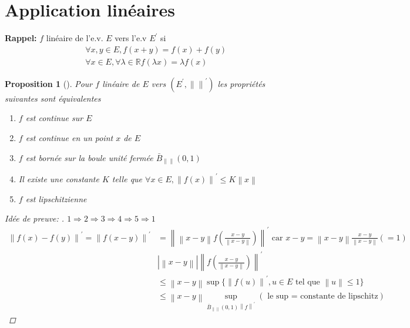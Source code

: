 \documentclass{article}
\theoremstyle{plain}%
\newtheorem{prop}[thm]{Proposition}
\theoremstyle{definition}
\theoremstyle{remark}
\begin{document}
\section{Application linéaires}

\textbf{Rappel:} $ f $ linéaire de l'e.v. $ E $ vers l'e.v $ E^\prime  $ si 
\begin{align*}
	&\forall x,y \in E, f(x+y) = f(x) + f(y) \\
	&\forall x \in E, \forall \lambda \in \mathbb{R} f(\lambda x) = \lambda f(x)
\end{align*}

\begin{prop}[]
	Pour $ f $ linéaire de $ E $ vers $ (E^\prime  , \left\|  \right\| ^\prime ) $ les propriétés suivantes sont équivalentes
	\begin{enumerate}
		\item $ f $ est continue sur $ E $ 
		\item $ f $ est continue en un point $ x $ de $ E $ 
		\item $ f $ est bornée sur la boule unité fermée $ \bar{B}_{\left\|  \right\| } (0,1)$ 
		\item Il existe une constante $ K $ telle que $ \forall x \in E, \left\| f(x) \right\| ^\prime  \leq K \left\| x \right\| $ 
		\item $ f $ est lipschitzienne
	\end{enumerate}
	\begin{proof}[Idée de preuve: ]
		$ 1 \Rightarrow 2 \Rightarrow 3 \Rightarrow 4 \Rightarrow 5 \Rightarrow 1 $
		\begin{align*}
			\left\| f(x) - f(y) \right\| ^\prime = \left\| f(x-y) \right\| ^\prime &= \left\| \left\| x-y \right\| f(\frac{x-y}{\left\| x-y \right\| }) \right\| ^\prime  \text{ car } x-y = \left\| x-y \right\| \frac{x-y}{\left\| x-y \right\| } (=1) \\
				& \left| \left\| x-y \right\|  \right| \left\| f(\frac{x-y}{\left\| x-y \right\| }) \right\| ^\prime \\
				&\leq \left\| x-y \right\| \sup \{\left\| f(u) \right\| ^\prime , u \in E \text{ tel que } \left\| u \right\| \leq 1\} \\
				&\leq \left\| x-y \right\| \sup_{\bar{B}_{\left\|  \right\| } (0,1) \left\| f \right\| ^\prime } (\text{ le sup = constante de lipschitz})
		\end{align*}
	\end{proof}
\end{prop}
\end{document}
